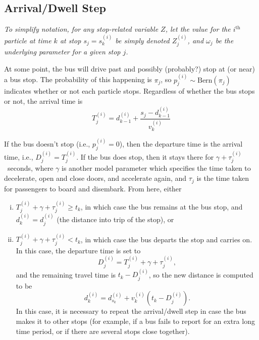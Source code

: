 \documentclass[10pt,a4paper]{article}
\begin{document}
\subsection{Arrival/Dwell Step}
\label{sec:arr-dwell}

\emph{To simplify notation, for any stop-related variable $Z$, 
let the value for the $i^\mathrm{th}$ particle at time $k$ at stop $s_j = s_k^{(i)}$ 
be simply denoted $Z_j^{(i)}$, and $\omega_j$ be the underlying parameter for a given stop $j$.}

\bigskip\noindent
At some point, the bus will drive past and possibly (probably?) stop at (or near) a bus stop.
The probability of this happening is $\pi_j$, so $p_j^{(i)} \sim \mathrm{Bern}(\pi_j)$ 
indicates whether or not each particle stops.
Regardless of whether the bus stops or not, the arrival time is
\begin{equation}
  \label{eq:arrival_time}
  T_j^{(i)} = d_{k-1}^{(i)} + \frac{s_j - d_{k-1}^{(i)}}{v_k^{(i)}}
\end{equation}

If the bus doesn't stop (i.e., $p_j^{(i)} = 0$), then the departure time is the arrival time,
i.e., $D_j^{(i)} = T_j^{(i)}$.
If the bus does stop, then it stays there for $\gamma + \tau_j^{(i)}$~seconds,
where $\gamma$ is another model parameter which specifies the time taken to decelerate, open and close doors,
and accelerate again, and $\tau_j$ is the time taken for passengers to board and disembark.
From here, either
\begin{enumerate}[i.]
\item 
  $T_j^{(i)} + \gamma + \tau_j^{(i)} \geq t_k$, in which case the bus remains at the bus stop, 
  and $d_k^{(i)} = d_j^{(i)}$ (the distance into trip of the stop), or
\item 
  $T_j^{(i)} + \gamma + \tau_j^{(i)} < t_k$, in which case the bus departs the stop and carries on.
  In this case, the departure time is set to
  \begin{equation}
    \label{eq:departure_time}
    D_j^{(i)} = T_j^{(i)} + \gamma + \tau_j^{(i)},
  \end{equation}
  and the remaining travel time is $t_k - D_j^{(i)}$, so the new distance is computed to be
  \begin{equation}
    \label{eq:distance_after_stopping}
    d_k^{(i)} = d_{s_k}^{(i)} + v_k^{(i)} \left( t_k - D_j^{(i)} \right).
  \end{equation}
  In this case, it is necessary to repeat the arrival/dwell step in case the bus makes it to other stops
  (for example, if a bus fails to report for an extra long time period, or if there are several stops
  close together).
\end{enumerate}
\end{document}
